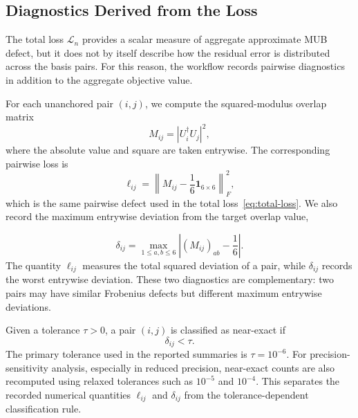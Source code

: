 \documentclass[a4paper,twocolumn,11pt,amsfonts,amssymb]{quantumarticle}
\begin{document}
\subsection{Diagnostics Derived from the Loss}

The total loss $\mathcal{L}_n$ provides a scalar measure of aggregate approximate MUB defect, but it does not by itself describe how the residual error is distributed across the basis pairs. For this reason, the workflow records pairwise diagnostics in addition to the aggregate objective value.

For each unanchored pair $(i,j)$, we compute the squared-modulus overlap matrix
\begin{equation}
    M_{ij}
    =
    |U_i^\dagger U_j|^2 ,
    \label{eq:overlap-matrix}
\end{equation}
where the absolute value and square are taken entrywise. The corresponding pairwise loss is
\begin{equation}
    \ell_{ij}
    =
    \left\|
    M_{ij}
    -
    \frac{1}{6}\mathbf{1}_{6 \times 6}
    \right\|_F^2 ,
    \label{eq:pairwise-loss-diagnostic}
\end{equation}
which is the same pairwise defect used in the total loss~\eqref{eq:total-loss}. We also record the maximum entrywise deviation from the target overlap value,

\begin{equation}
    \delta_{ij}
    =
    \max_{1 \leq a,b \leq 6}
    \left|
    (M_{ij})_{ab}
    -
    \frac{1}{6}
    \right|.
    \label{eq:max-deviation}
\end{equation}
The quantity \(\ell_{ij}\) measures the total squared deviation of a pair, while \(\delta_{ij}\) records the worst entrywise deviation. These two diagnostics are complementary: two pairs may have similar Frobenius defects but different maximum entrywise deviations.


Given a tolerance $\tau>0$, a pair $(i,j)$ is classified as near-exact if
\begin{equation}
    \delta_{ij} < \tau .
    \label{eq:near-exact-classification}
\end{equation}
The primary tolerance used in the reported summaries is \(\tau=10^{-6}\). For precision-sensitivity analysis, especially in reduced precision, near-exact counts are also recomputed using relaxed tolerances such as \(10^{-5}\) and \(10^{-4}\). This separates the recorded numerical quantities \(\ell_{ij}\) and \(\delta_{ij}\) from the tolerance-dependent classification rule.
\end{document}
